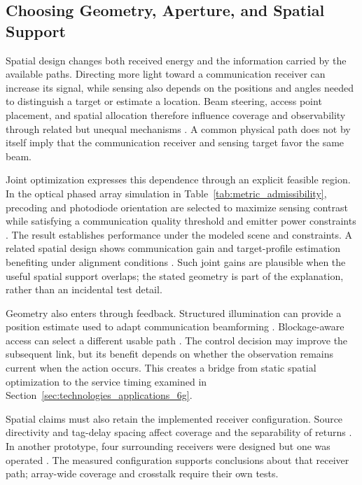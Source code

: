 \subsection{Choosing Geometry, Aperture, and Spatial Support}

Spatial design changes both received energy and the information carried by the
available paths. Directing more light toward a communication receiver can
increase its signal, while sensing also depends on the positions and angles
needed to distinguish a target or estimate a location. Beam steering, access
point placement, and spatial allocation therefore influence coverage and
observability through related but unequal mechanisms
\cite{OISAC_SCR00036,OISAC_SCR00527,OISAC_SCR00914}. A common physical path
does not by itself imply that the communication receiver and sensing target
favor the same beam.

Joint optimization expresses this dependence through an explicit feasible
region. In the optical phased array simulation in
Table~\ref{tab:metric_admissibility}, precoding and photodiode orientation are
selected to maximize sensing contrast while satisfying a communication quality
threshold and emitter power constraints \cite{OISAC_SCR00940}. The result
establishes performance under the modeled scene and constraints. A related
spatial design shows communication gain and target-profile estimation
benefiting under alignment conditions \cite{OISAC_SCR00941}. Such joint gains
are plausible when the useful spatial support overlaps; the stated geometry is
part of the explanation, rather than an incidental test detail.

Geometry also enters through feedback. Structured illumination can provide a
position estimate used to adapt communication beamforming
\cite{OISAC_SCR00196}. Blockage-aware access can select a different usable
path \cite{OISAC_SCR01011}. The control decision may improve the subsequent
link, but its benefit depends on whether the observation remains current when
the action occurs. This creates a bridge from static spatial optimization to
the service timing examined in Section~\ref{sec:technologies_applications_6g}.

Spatial claims must also retain the implemented receiver configuration. Source
directivity and tag-delay spacing affect coverage and the separability of
returns \cite{OISAC_SCR01024,OISAC_SCR01050}. In another prototype, four
surrounding receivers were designed but one was operated
\cite{OISAC_SCR00619}. The measured configuration supports conclusions about
that receiver path; array-wide coverage and crosstalk require their own tests.

